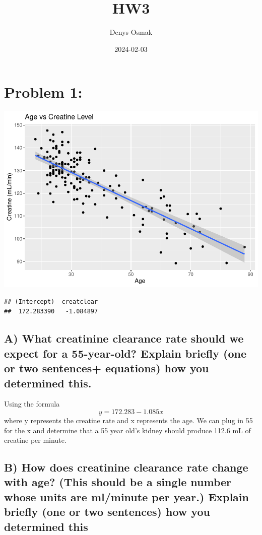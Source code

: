 \documentclass[
]{article}
\title{HW3}
\author{Denys Osmak}
\date{2024-02-03}
\begin{document}
\maketitle

\hypertarget{problem-1}{%
\section{Problem 1:}\label{problem-1}}

\includegraphics{HW3_files/figure-latex/unnamed-chunk-2-1.pdf}

\begin{verbatim}
## (Intercept)  creatclear 
##  172.283390   -1.084897
\end{verbatim}

\hypertarget{a-what-creatinine-clearance-rate-should-we-expect-for-a-55-year-old-explain-briefly-one-or-two-sentences-equations-how-you-determined-this.}{%
\subsection{A) What creatinine clearance rate should we expect for a
55-year-old? Explain briefly (one or two sentences+ equations) how you
determined
this.}\label{a-what-creatinine-clearance-rate-should-we-expect-for-a-55-year-old-explain-briefly-one-or-two-sentences-equations-how-you-determined-this.}}

Using the formula \[ y = 172.283 - 1.085x \] where y represents the
creatine rate and x represents the age. We can plug in 55 for the x and
determine that a 55 year old's kidney should produce 112.6 mL of
creatine per minute.

\hypertarget{b-how-does-creatinine-clearance-rate-change-with-age-this-should-be-a-single-number-whose-units-are-mlminute-per-year.-explain-briefly-one-or-two-sentences-how-you-determined-this}{%
\subsection{B) How does creatinine clearance rate change with age? (This
should be a single number whose units are ml/minute per year.) Explain
briefly (one or two sentences) how you determined
this}\label{b-how-does-creatinine-clearance-rate-change-with-age-this-should-be-a-single-number-whose-units-are-mlminute-per-year.-explain-briefly-one-or-two-sentences-how-you-determined-this}}
\end{document}
